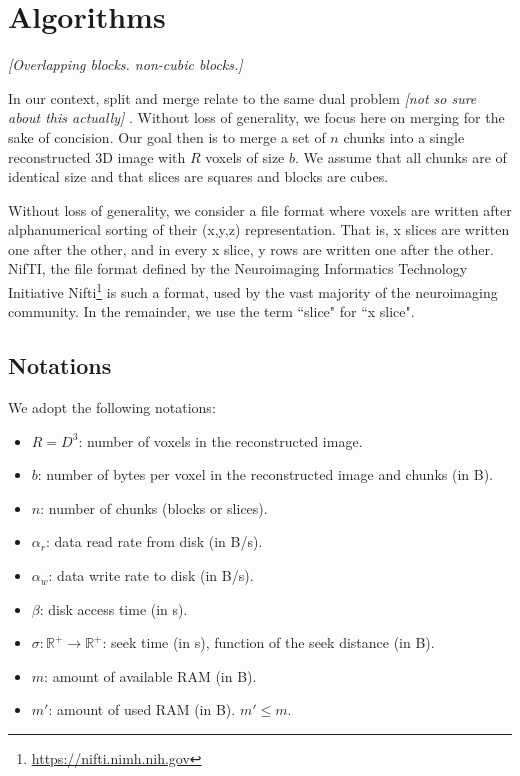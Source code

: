 \documentclass[10pt, conference, compsocconf]{IEEEtran}
\newcommand{\todo}[1]{
  \color{red}\emph{[#1]}
  \color{black}
}
\begin{document}

\newpage

\section{Algorithms}
\label{sec:algos}

\todo{Overlapping blocks. non-cubic blocks.}

In our context, split and merge relate to the same dual
problem \todo{not so sure about this actually}. Without loss of
generality, we focus here on merging for the sake of concision. Our
goal then is to merge a set of $n$ chunks into a single reconstructed
3D image with $R$ voxels of size $b$. We assume that all chunks are of
identical size and that slices are squares and blocks are cubes.

Without loss of generality, we consider a file format where voxels are
written after alphanumerical sorting of their (x,y,z)
representation. That is, x slices are written one after the other, and
in every x slice, y rows are written one after the other. NifTI, the
file format defined by the Neuroimaging Informatics Technology
Initiative Nifti\footnote{\url{https://nifti.nimh.nih.gov}} is such a
format, used by the vast majority of the neuroimaging community. In
the remainder, we use the term ``slice" for ``x slice".

\subsection{Notations}

We adopt the following notations:
\begin{itemize}
\item $R=D^3$: number of voxels in the reconstructed image.
\item $b$: number of bytes per voxel in the reconstructed image and chunks (in B).
\item $n$: number of chunks (blocks or slices).
\item $\alpha_r$: data read rate from disk (in B/s).
\item $\alpha_w$: data write rate to disk (in B/s).
\item $\beta$: disk access time (in s).
\item $\sigma: \mathbb{R}^{+} \rightarrow \mathbb{R}^{+}$: seek time (in s), function of the seek
  distance (in B).
\item $m$: amount of available RAM (in B).
  \item $m'$: amount of used RAM (in B). $m'\leq m$.
\end{itemize}
\end{document}
